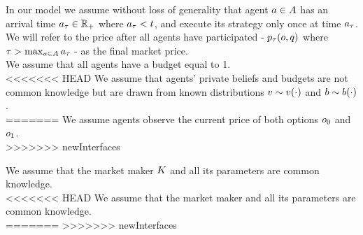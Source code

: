 In our model we assume without loss of generality that agent $a \in A$ has an arrival time 
$a_\tau \in \mathbb{R}_+$ where $a_\tau < t$, 
and execute its strategy only once at time $a_\tau$. We will refer to the price after all agents have participated - $p_{\tau}(o,q)$ where $\tau > \max_{a \in A} a_\tau$ - as the final market price.\\

We assume that all agents have a budget equal to 1.\\

<<<<<<< HEAD
We assume that agents' private beliefs and budgets are not common knowledge
but are drawn from known distributions $v \sim v(\cdot)$ and
$b \sim b(\cdot)$.\\
=======
We assume agents observe the current price of both options $o_0$ and $o_1$.\\
>>>>>>> newInterfaces

We assume that the market maker $K$ and all its parameters are common knowledge.\\

<<<<<<< HEAD
We assume that the market maker and all its parameters are common knowledge.\\
=======
>>>>>>> newInterfaces
